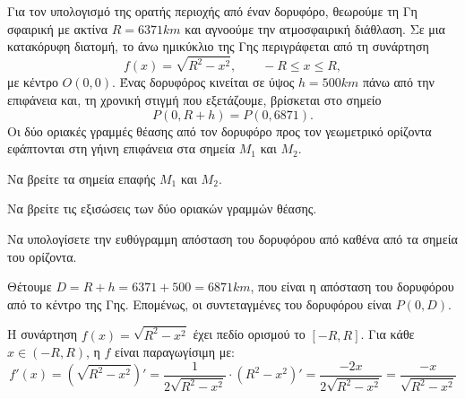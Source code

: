{{}{
Για τον υπολογισμό της ορατής περιοχής από έναν δορυφόρο,
θεωρούμε τη Γη σφαιρική με ακτίνα $R=6371\si{km}$ και αγνοούμε την
ατμοσφαιρική διάθλαση. Σε μια κατακόρυφη διατομή, το άνω ημικύκλιο της
Γης περιγράφεται από τη συνάρτηση
\[
  f(x)=\sqrt{R^2-x^2},\qquad -R\leq x\leq R,
\]
με κέντρο $O(0,0)$. Ένας δορυφόρος κινείται σε ύψος
$h=500\si{km}$ πάνω από την επιφάνεια και, τη χρονική στιγμή που
εξετάζουμε, βρίσκεται στο σημείο
\[
  P(0,R+h)=P(0,6871).
\]
Οι δύο οριακές γραμμές θέασης από τον δορυφόρο προς τον γεωμετρικό
ορίζοντα εφάπτονται στη γήινη επιφάνεια στα σημεία $M_1$ και $M_2$.
\begin{alist}
\item Να βρείτε τα σημεία επαφής $M_1$ και $M_2$.
\item Να βρείτε τις εξισώσεις των δύο οριακών γραμμών θέασης.
\item Να υπολογίσετε την ευθύγραμμη απόσταση του δορυφόρου από καθένα από τα σημεία του ορίζοντα.
\end{alist}\vspace{5mm}}}

\lysh
Θέτουμε $D=R+h=6371+500=6871\si{km}$, που είναι η απόσταση του δορυφόρου από το κέντρο της Γης. Επομένως, οι συντεταγμένες του δορυφόρου είναι $P(0, D)$.

Η συνάρτηση $f(x)=\sqrt{R^2-x^2}$ έχει πεδίο ορισμού το $[-R, R]$. 
Για κάθε $x \in (-R, R)$, η $f$ είναι παραγωγίσιμη με:
\[f'(x)=\left(\sqrt{R^2-x^2}\right)'=\frac{1}{2\sqrt{R^2-x^2}}\cdot(R^2-x^2)'=\frac{-2x}{2\sqrt{R^2-x^2}}=\frac{-x}{\sqrt{R^2-x^2}}\]

